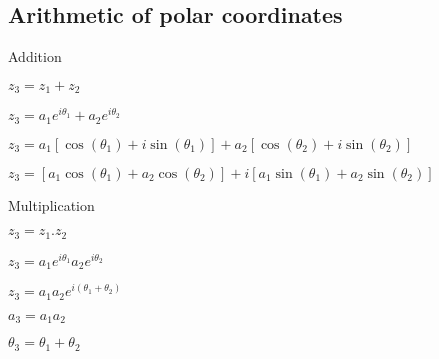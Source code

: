 
\subsection{Arithmetic of polar coordinates}

Addition

\(z_3=z_1+z_2\)

\(z_3=a_1e^{i\theta_1}+a_2e^{i\theta_2}\)

\(z_3=a_1[\cos(\theta_1)+i\sin(\theta_1)]+a_2[\cos(\theta_2)+i\sin(\theta_2)]\)

\(z_3=[a_1\cos(\theta_1)+a_2\cos(\theta_2)]+i[a_1\sin(\theta_1)+a_2 \sin(\theta_2)]\)

Multiplication

\(z_3=z_1.z_2\)

\(z_3=a_1e^{i\theta_1}a_2e^{i\theta_2}\)

\(z_3=a_1a_2e^{i(\theta_1+\theta_2)}\)

\(a_3=a_1a_2\)

\(\theta_3=\theta_1+\theta_2\)

